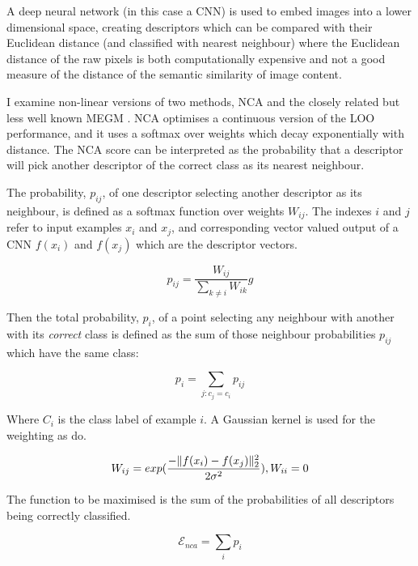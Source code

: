 A deep neural network (in this case a \gls{CNN}) is used to embed images into a lower dimensional space, creating descriptors which can be compared with their Euclidean distance (and classified with nearest neighbour) where the Euclidean distance of the raw pixels is both computationally expensive and not a good measure of the distance of the semantic similarity of image content. 

I examine non-linear versions of two methods, \gls{NCA} \cite{Goldberger2004} and the closely related but less well known \gls{MEGM} \cite {Zaidi2011}. \gls{NCA} optimises a continuous version of the \gls{LOO} performance, and it uses a softmax over weights which decay exponentially with distance. The \gls{NCA} score can be interpreted as the probability that a descriptor will pick another descriptor of the correct class as its nearest neighbour. 

The probability, $ p_{ij} $, of one descriptor selecting another descriptor as its neighbour, is defined as a softmax function over weights $W_{ij}$. The indexes $ i $ and $ j $ refer to input examples $x_i$ and $x_j$, and corresponding vector valued output of a \gls{CNN} $f(x_i)$ and $f(x_j)$ which are the descriptor vectors.

\begin{equation}
\label{eq:nca_prob_pair}
p_{ij} =  \frac {W_{ij}} {\sum_{k \neq i}{W_{ik}}}g
\end{equation}

Then the total probability, $ p_i $, of a point selecting any neighbour with another with its \emph{correct} class is defined as the sum of those neighbour probabilities $p_{ij}$ which have the same class:

\begin{equation}
\label{eq:nca_prob}
p_{i} =  \sum_{j:c_j = c_i}{p_{ij}}
\end{equation}
 
Where $ C_i $ is the class label of example $ i $. A Gaussian kernel is used for the weighting as \cite{Zaidi2011} do.  

\begin{equation}
 \label{eq:gaussian_kernel}
W_{ij} = exp(\frac{-\lVert f(x_i) - f(x_j) \rVert^2_2 }{2\sigma^2}), \space W_{ii} = 0
\end{equation}


The function to be maximised is the sum of the probabilities of all descriptors being correctly classified.

\begin{equation}
\label{eq:nca_loss}
\mathcal{E}_{nca} =  \sum_i {p_i}
\end{equation}

